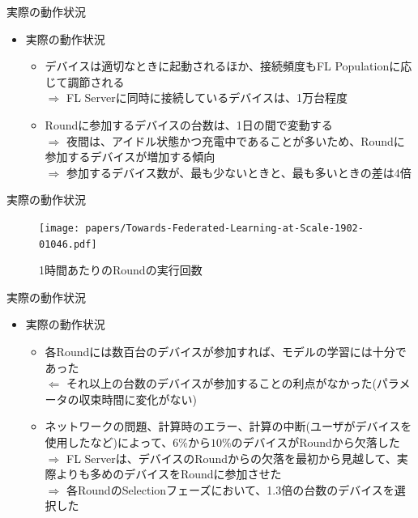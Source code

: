 \documentclass[dvipdfmx,notheorems,t]{beamer}
\begin{document}
\begin{frame}{実際の動作状況}

\begin{itemize}
	\item 実際の動作状況
	\begin{itemize}
		\item デバイスは適切なときに起動されるほか、接続頻度もFL Populationに応じて調節される \\
		$\Rightarrow$ FL Serverに同時に接続しているデバイスは、1万台程度
		\newline
		
		\item Roundに参加するデバイスの台数は、1日の間で変動する \\
		$\Rightarrow$ 夜間は、アイドル状態かつ充電中であることが多いため、Roundに参加するデバイスが増加する傾向 \\
		$\Rightarrow$ 参加するデバイス数が、最も少ないときと、最も多いときの差は4倍
	\end{itemize}
\end{itemize}

\end{frame}

\begin{frame}{実際の動作状況}

\begin{figure}
	\centering
	\texttt{[image: papers/Towards-Federated-Learning-at-Scale-1902-01046.pdf]}
	\caption{1時間あたりのRoundの実行回数~\cite{DBLP:journals/corr/abs-1902-01046}}
	\label{fig:round-completion-rate}
\end{figure}

\end{frame}

\begin{frame}{実際の動作状況}

\begin{itemize}
	\item 実際の動作状況
	\begin{itemize}
		\item 各Roundには数百台のデバイスが参加すれば、モデルの学習には十分であった \\
		$\Leftarrow$ それ以上の台数のデバイスが参加することの利点がなかった(パラメータの収束時間に変化がない)
		\newline
		
		\item ネットワークの問題、計算時のエラー、計算の中断(ユーザがデバイスを使用したなど)によって、$6\%$から$10\%$のデバイスがRoundから欠落した \\
		$\Rightarrow$ FL Serverは、デバイスのRoundからの欠落を最初から見越して、実際よりも多めのデバイスをRoundに参加させた \\
		$\Rightarrow$ 各RoundのSelectionフェーズにおいて、1.3倍の台数のデバイスを選択した
	\end{itemize}
\end{itemize}

\end{frame}
\end{document}
